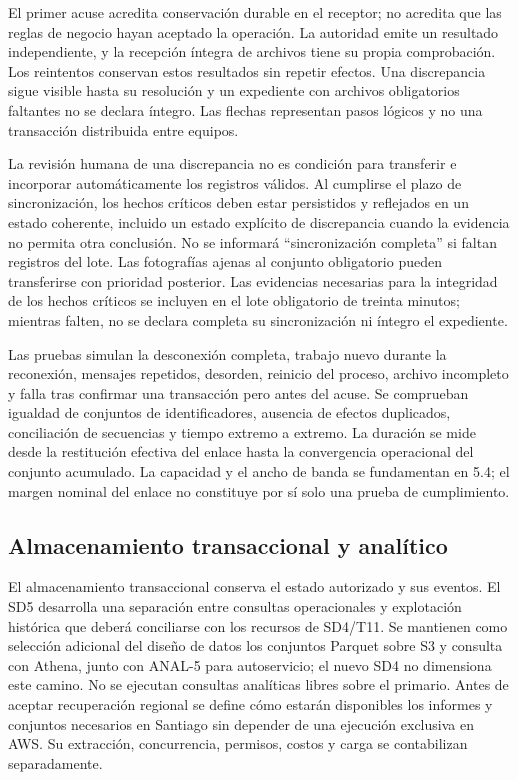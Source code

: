 El primer acuse acredita conservación durable en el receptor; no acredita que las reglas de negocio hayan aceptado la operación. La autoridad emite un resultado independiente, y la recepción íntegra de archivos tiene su propia comprobación. Los reintentos conservan estos resultados sin repetir efectos. Una discrepancia sigue visible hasta su resolución y un expediente con archivos obligatorios faltantes no se declara íntegro. Las flechas representan pasos lógicos y no una transacción distribuida entre equipos.

La revisión humana de una discrepancia no es condición para transferir e incorporar automáticamente los registros válidos. Al cumplirse el plazo de sincronización, los hechos críticos deben estar persistidos y reflejados en un estado coherente, incluido un estado explícito de discrepancia cuando la evidencia no permita otra conclusión. No se informará ``sincronización completa'' si faltan registros del lote. Las fotografías ajenas al conjunto obligatorio pueden transferirse con prioridad posterior. Las evidencias necesarias para la integridad de los hechos críticos se incluyen en el lote obligatorio de treinta minutos; mientras falten, no se declara completa su sincronización ni íntegro el expediente.

Las pruebas simulan la desconexión completa, trabajo nuevo durante la reconexión, mensajes repetidos, desorden, reinicio del proceso, archivo incompleto y falla tras confirmar una transacción pero antes del acuse. Se comprueban igualdad de conjuntos de identificadores, ausencia de efectos duplicados, conciliación de secuencias y tiempo extremo a extremo. La duración se mide desde la restitución efectiva del enlace hasta la convergencia operacional del conjunto acumulado. La capacidad y el ancho de banda se fundamentan en 5.4; el margen nominal del enlace no constituye por sí solo una prueba de cumplimiento.

\subsection{Almacenamiento transaccional y analítico}
\label{subsec:sd5_analitica}

El almacenamiento transaccional conserva el estado autorizado y sus eventos. El SD5 desarrolla una separación entre consultas operacionales y explotación histórica que deberá conciliarse con los recursos de SD4/T11. Se mantienen como selección adicional del diseño de datos los conjuntos Parquet sobre S3 y consulta con Athena, junto con ANAL-5 para autoservicio; el nuevo SD4 no dimensiona este camino. No se ejecutan consultas analíticas libres sobre el primario. Antes de aceptar recuperación regional se define cómo estarán disponibles los informes y conjuntos necesarios en Santiago sin depender de una ejecución exclusiva en AWS. Su extracción, concurrencia, permisos, costos y carga se contabilizan separadamente.

